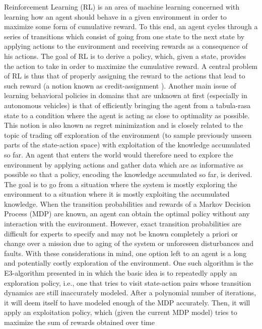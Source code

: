 Reinforcement Learning (RL) is an area of machine learning concerned with learning how an agent should behave in a given environment in order to maximize some form of cumulative reward. To this end, an agent cycles through a series of transitions which consist of going from one state to the next state by applying actions to the environment and receiving rewards as a consequence of his actions. The goal of RL is to derive a policy, which, given a state, provides the action to take in order to maximize the cumulative reward.
A central problem of RL is thus that of properly assigning the reward to the actions that lead to such reward (a notion known as credit-assignment \cite{kaelbling1996reinforcement, sutton1998reinforcement}). 
Another main issue of learning behavioral policies in domains that are unknown at first (especially in autonomous vehicles) is that of efficiently bringing the agent from a tabula-rasa state to a condition where the agent is acting as close to optimality as possible. This notion is also known as regret minimization \cite{kaelbling1996reinforcement, sutton1998reinforcement} and is closely related to the topic of trading off exploration of the environment (to sample previously unseen parts of the state-action space) with exploitation of the knowledge accumulated so far. 
An agent that enters the world would therefore need to explore the environment by applying actions and gather data which are as informative as possible so that a policy, encoding the knowledge accumulated so far, is derived. The goal is to go from a situation where the system is mostly exploring the environment to a situation where it is mostly exploiting the accumulated knowledge. 
When the transition probabilities and rewards of a Markov Decision Process (MDP) are known, an agent can obtain the optimal policy without any interaction with the environment. However, exact transition probabilities are difficult for experts to specify and may not be known completely a priori or change over a mission due to aging of the system or unforeseen disturbances and faults. With these considerations in mind, one option left to an agent is a long and potentially costly exploration of the environment. One such algorithm is the E3-algorithm presented in \cite{kearns2002near} in which the basic idea is to repeatedly apply an exploration policy, i.e., one that tries to visit state-action pairs whose transition dynamics are still inaccurately modeled. After a polynomial number of iterations, it will deem itself to have modeled enough of the MDP accurately. Then, it will apply an exploitation policy, which (given the current MDP model) tries to maximize the sum of rewards obtained over time 
